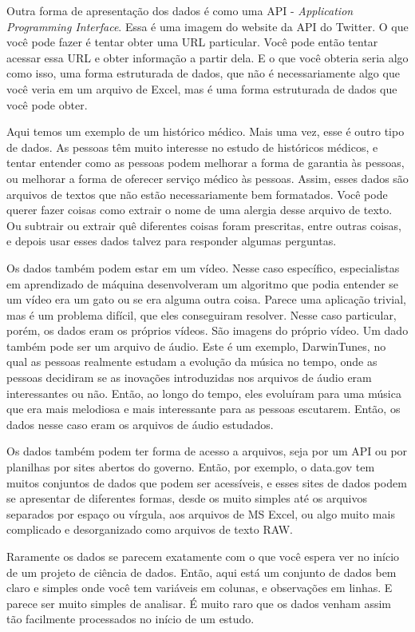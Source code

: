 \begin{multicols}{2}
\begin{footnotesize}
Outra forma de apresentação dos dados é como uma API - \textit{Application Programming Interface}. Essa é uma imagem do website da API do Twitter. O que você pode fazer é tentar obter uma URL particular. Você pode então tentar acessar essa URL e obter informação a partir dela. E o que você obteria seria algo como isso, uma forma estruturada de dados,  que não é necessariamente algo que você veria em um arquivo de Excel, mas é uma forma estruturada de dados que você pode obter. 

Aqui temos um exemplo de um histórico médico. Mais uma vez, esse é outro tipo de dados. As pessoas têm muito interesse no estudo de históricos médicos, e tentar entender como as pessoas podem melhorar a forma de garantia às pessoas, ou melhorar a forma de oferecer serviço médico às pessoas. Assim, esses dados são arquivos de textos que não estão necessariamente bem formatados. Você pode querer fazer coisas como extrair o nome de uma alergia desse arquivo de texto. Ou subtrair ou extrair quê diferentes coisas foram prescritas, entre outras coisas, e depois usar esses dados talvez para responder algumas perguntas.

Os dados também podem estar em um vídeo. Nesse caso específico, especialistas em aprendizado de máquina desenvolveram um algoritmo que podia entender se um vídeo era um gato ou se era alguma outra coisa. Parece uma aplicação trivial, mas é um problema difícil, que eles conseguiram resolver. Nesse caso particular, porém, os dados eram os próprios vídeos. São imagens do próprio vídeo. Um dado também pode ser um arquivo de áudio. Este é um exemplo, DarwinTunes, no qual as pessoas realmente estudam a evolução da música no tempo, onde as pessoas decidiram se as inovações introduzidas nos arquivos de áudio eram interessantes ou não. Então, ao longo do tempo, eles evoluíram para uma música que era mais melodiosa e mais interessante para as pessoas escutarem. Então, os dados nesse caso eram os arquivos de áudio estudados.

Os dados também podem ter forma de acesso a arquivos, seja por um API ou por planilhas por sites abertos do governo. Então, por exemplo, o data.gov tem muitos conjuntos de dados que podem ser acessíveis, e esses sites de dados podem se apresentar de diferentes formas, desde os muito simples até os arquivos separados por espaço ou vírgula, aos arquivos de MS Excel, ou algo muito mais complicado e desorganizado como arquivos de texto RAW. 

Raramente os dados se parecem exatamente com o que você espera ver no início de um projeto de ciência de dados. Então, aqui está um conjunto de dados bem claro e simples onde você tem variáveis em colunas, e observações em linhas. E parece ser muito simples de analisar. É muito raro que os dados venham assim tão facilmente processados no início de um estudo. 


\end{footnotesize}
\end{multicols}
